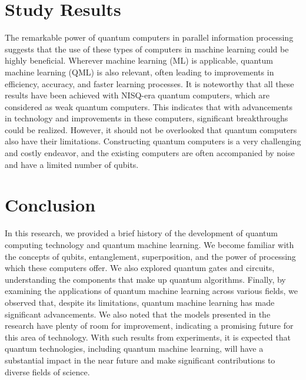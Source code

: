 \documentclass[conference]{IEEEtran}
\begin{document}
\section{Study Results}
The remarkable power of quantum computers in parallel information processing suggests that the use of these types of computers in machine learning could be highly beneficial. Wherever machine learning (ML) is applicable, quantum machine learning (QML) is also relevant, often leading to improvements in efficiency, accuracy, and faster learning processes. It is noteworthy that all these results have been achieved with NISQ-era quantum computers, which are considered as weak quantum computers. This indicates that with advancements in technology and improvements in these computers, significant breakthroughs could be realized. However, it should not be overlooked that quantum computers also have their limitations. Constructing quantum computers is a very challenging and costly endeavor, and the existing computers are often accompanied by noise and have a limited number of qubits.

\section{Conclusion}
In this research, we provided a brief history of the development of quantum computing technology and quantum machine learning. We become familiar with the concepts of qubits, entanglement, superposition, and the power of processing which these computers offer. We also explored quantum gates and circuits, understanding the components that make up quantum algorithms. Finally, by examining the applications of quantum machine learning across various fields, we observed that, despite its limitations, quantum machine learning has made significant advancements. We also noted that the models presented in the research have plenty of room for improvement, indicating a promising future for this area of technology. With such results from experiments, it is expected that quantum technologies, including quantum machine learning, will have a substantial impact in the near future and make significant contributions to diverse fields of science.
\end{document}
